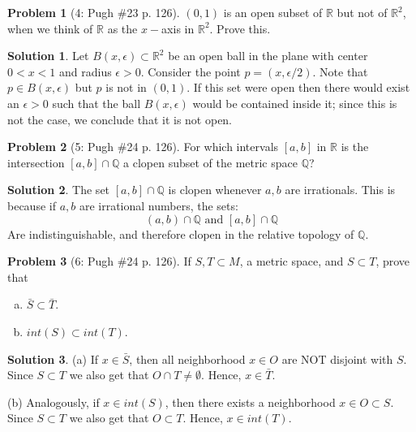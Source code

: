 \documentclass{article}
\theoremstyle{definition}
\newtheorem*{soln}{Solution}
\newtheorem*{prob}{Problem}
\theoremstyle{theorem}
\newcommand{\R}{\mathbb{R}}
\newcommand{\Q}{\mathbb{Q}}
\newcommand{\E}{\emptyset}
\begin{document}
\begin{prob}[4: Pugh \#23 p. 126]
    $(0,1)$ is an open subset of $\R$ but not of $\R^2$, when we think of $\R$ as the $x-$axis in $\R^2$. Prove this.
\end{prob}
\begin{soln}
    Let $B(x,\epsilon)\subset \R^{2 }$ be an open ball in the plane with center $0<x<1$ and radius $\epsilon >0$. Consider the point $p = (x,\epsilon/2)$. Note that $p\in B(x,\epsilon)$ but $p$ is not in $(0,1)$. If this set were open then there would exist an $\epsilon >0$ such that the ball $B(x,\epsilon)$ would be contained inside it; since this is not the case, we conclude that it is not open.
\end{soln}
\vspace{1in}


\begin{prob}[5: Pugh \#24 p. 126]
    For which intervals $[a,b]$ in $\R$ is the intersection $[a,b]\cap \Q$ a clopen subset of the metric space $\Q$?
\end{prob}
\begin{soln}
    The set $[a,b]\cap \Q$ is clopen whenever $a,b$ are irrationals. This is because if $a,b$ are irrational numbers, the sets:
    $$(a,b)\cap \Q \text{ and } [a,b] \cap \Q$$
    Are indistinguishable, and therefore clopen in the relative topology of $\Q$.
\end{soln}
\vspace{1in}
\begin{prob}[6: Pugh \#24 p. 126]
    If $S,T \subset M$, a metric space, and $S\subset T$, prove that 
    \begin{enumerate}[(a)]
        \item $\bar S \subset \bar T$.
        \item $int(S) \subset int(T)$.
    \end{enumerate}
\end{prob}
\begin{soln}
    (a) If $x\in \bar S$, then all neighborhood $x\in O$ are NOT disjoint with $S$. Since $S\subset T$ we also get that $O\cap T \neq \E$. Hence, $x\in \bar T$.

    (b) Analogously,  if $x\in int(S)$, then there exists a neighborhood $x\in O\subset S$. Since $S\subset T$ we also get that $O\subset T $. Hence, $x\in int( T)$.
\end{soln}
\end{document}
